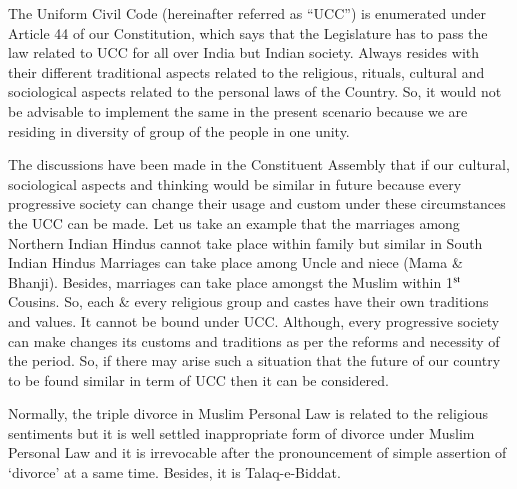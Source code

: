 \setcounter{figure}{0}
\setcounter{table}{0}
\setcounter{footnote}{0}




\begin{multicols}{2}


\noi
The Uniform Civil Code (hereinafter referred as “UCC”) is enumerated under Article 44 of
our Constitution, which says that the Legislature has to pass the law related to UCC for all
over India but Indian society. Always resides with their different traditional aspects related to
the religious, rituals, cultural and sociological aspects related to the personal laws of the
Country. So, it would not be advisable to implement the same in the present scenario because
we are residing in diversity of group of the people in one unity.

\vspace{-.1cm}

\noi
The discussions have been made in the Constituent Assembly that if our cultural, sociological
aspects and thinking would be similar in future because every progressive society can change
their usage and custom under these circumstances the UCC can be made. Let us take an
example that the marriages among Northern Indian Hindus cannot take place within family
but similar in South Indian Hindus Marriages can take place among Uncle and niece (Mama
\& Bhanji). Besides, marriages can take place amongst the Muslim within 1$^{\rm st}$ Cousins. So,
each \& every religious group and castes have their own traditions and values. It cannot be
bound under UCC. Although, every progressive society can make changes its customs and
traditions as per the reforms and necessity of the period. So, if there may arise such a
situation that the future of our country to be found similar in term of UCC then it can be
considered.

\vspace{-.1cm}

\noi
Normally, the triple divorce in Muslim Personal Law is related to the religious sentiments but
it is well settled inappropriate form of divorce under Muslim Personal Law and it is
irrevocable after the pronouncement of simple assertion of ‘divorce’ at a same time. Besides,
it is Talaq-e-Biddat.


\end{multicols}
